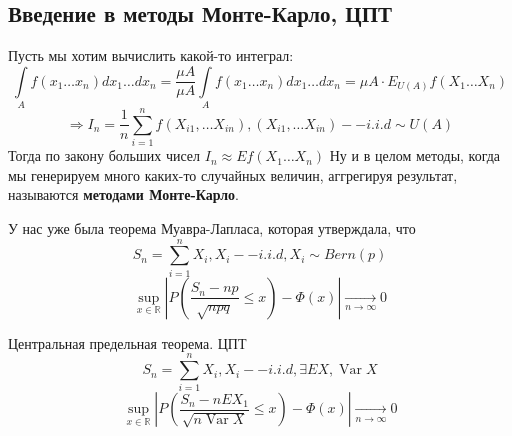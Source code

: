 \documentclass{article}
\DeclareMathOperator{\Var}{Var}
\begin{document}
    \subsection{Введение в методы Монте-Карло, ЦПТ}
    Пусть мы хотим вычислить какой-то интеграл: 
    $$\int\limits_A f(x_1 \dots x_n) dx_1 \dots dx_n = \frac{\mu A}{\mu A} \int\limits_A f(x_1 \dots x_n) dx_1 \dots dx_n = \mu A \cdot E_{U(A)} f(X_1 \dots X_n) $$
    $$ \Rightarrow I_n = \frac{1}{n} \sum\limits_{i=1}^n f(X_{i1}, \dots X_{in}), (X_{i1}, \dots  X_{in}) -- i.i.d \sim U(A) $$
    Тогда по закону больших чисел $I_n \approx Ef(X_1 \dots X_n)$
    Ну и в целом методы, когда мы генерируем много каких-то случайных величин, аггрегируя результат, называются \textbf{методами Монте-Карло}.
    \begin{remark}
        У нас уже была теорема Муавра-Лапласа, которая утверждала, что
        $$
            S_n = \sum\limits_{i=1}^n X_i, X_i -- i.i.d, X_i \sim Bern(p)
        $$
        $$
        \sup_{x\in\mathbb{R}} |P(\frac{S_n-np}{\sqrt{npq}}\le x) - \Phi(x)|\underset{n\to\infty}\longrightarrow0
        $$
        
    \end{remark}
    \begin{theorem}{Центральная предельная теорема. ЦПТ}
        $$
            S_n = \sum\limits_{i=1}^n X_i, X_i -- i.i.d, \exists EX, \Var X
        $$
        $$
        \sup_{x\in\mathbb{R}} |P(\frac{S_n-nEX_1}{\sqrt{n\Var X}}\le x) - \Phi(x)|\underset{n\to\infty}\longrightarrow0
        $$
    \end{theorem}
\end{document}
